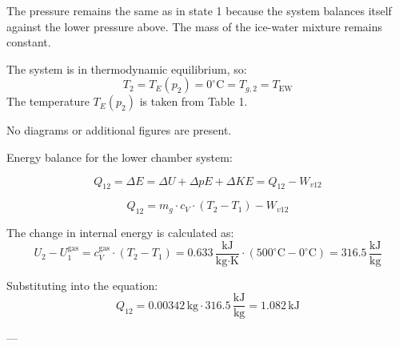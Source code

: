 The pressure remains the same as in state 1 because the system balances itself against the lower pressure above. The mass of the ice-water mixture remains constant.  

The system is in thermodynamic equilibrium, so:  
\[
T_2 = T_E(p_2) = 0^\circ\text{C} = T_{g,2} = T_{\text{EW}}
\]  
The temperature \( T_E(p_2) \) is taken from Table 1.  

No diagrams or additional figures are present.

Energy balance for the lower chamber system:  

\[
Q_{12} = \Delta E = \Delta U + \Delta pE + \Delta KE = Q_{12} - W_{v12}
\]

\[
Q_{12} = m_g \cdot c_V \cdot (T_2 - T_1) - W_{v12}
\]

The change in internal energy is calculated as:  
\[
U_{2} - U_{1}^{\text{gas}} = c_V^{\text{gas}} \cdot (T_2 - T_1) = 0.633 \, \frac{\text{kJ}}{\text{kg·K}} \cdot (500^\circ\text{C} - 0^\circ\text{C}) = 316.5 \, \frac{\text{kJ}}{\text{kg}}
\]

Substituting into the equation:  
\[
Q_{12} = 0.00342 \, \text{kg} \cdot 316.5 \, \frac{\text{kJ}}{\text{kg}} = 1.082 \, \text{kJ}
\]

---